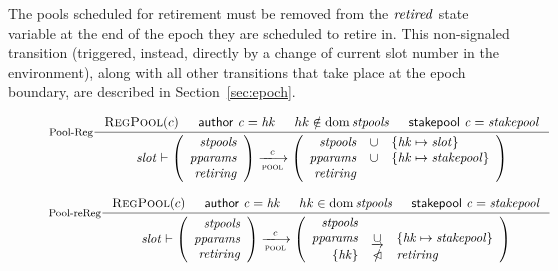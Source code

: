 The pools scheduled for retirement must be removed from
the $\mathit{retired}$ state variable at the end of the epoch they are scheduled
to retire in. This non-signaled transition (triggered, instead, directly by a
change of current slot number in the environment), along with all other transitions
that take place at the epoch boundary, are described in Section~\ref{sec:epoch}.


\begin{figure}
  \begin{equation}\label{eq:pool-reg}
    \inference[Pool-Reg]
    {
      \RegPool{c}
      & \cauthor{c} = \var{hk}
      & hk \notin \dom \var{stpools}
      & \stakepool{c} = \var{stakepool}
    }
    {
      \var{slot} \vdash
      \left(
      \begin{array}{r}
        \var{stpools} \\
        \var{pparams} \\
        \var{retiring}
      \end{array}
      \right)
      \trans{pool}{c}
      \left(
      \begin{array}{rcl}
        \var{stpools} & \union
                      & \{\var{hk} \mapsto \var{slot}\} \\
        \var{pparams} & \union
                      & \{\var{hk} \mapsto \var{stakepool}\} \\
       \var{retiring} \\
      \end{array}
      \right)
    }
  \end{equation}

  \begin{equation}\label{eq:pool-rereg}
    \inference[Pool-reReg]
    {
      \RegPool{c}
      & \cauthor{c} = \var{hk}
      & hk \in \dom \var{stpools}
      & \stakepool{c} = \var{stakepool}
    }
    {
      \var{slot} \vdash
      \left(
      \begin{array}{r}
        \var{stpools} \\
        \var{pparams} \\
        \var{retiring}
      \end{array}
      \right)
      \trans{pool}{c}
      \left(
      \begin{array}{rcl}
        \var{stpools} \\
        \var{pparams} & \unionoverrideRight
                      & \{\var{hk} \mapsto \var{stakepool}\} \\
        \{\var{hk}\} & \subtractdom & \var{retiring} \\
      \end{array}
      \right)
    }
  \end{equation}


\end{figure}
